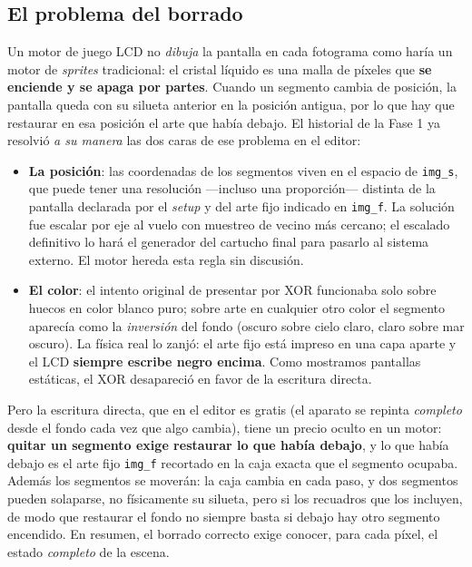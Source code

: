 \subsection{El problema del borrado}
\label{subsec:ProblemaBorrado}

Un motor de juego LCD no \emph{dibuja} la pantalla en cada fotograma como haría un motor de \textit{sprites} tradicional: el cristal líquido es una malla de píxeles que \textbf{se enciende y se apaga por partes}. Cuando un segmento cambia de posición, la pantalla queda con su silueta anterior en la posición antigua, por lo que hay que restaurar en esa posición el arte que había debajo. El historial de la Fase 1 ya resolvió \emph{a su manera} las dos caras de ese problema en el editor:

\begin{itemize}
	\item \textbf{La posición}: las coordenadas de los segmentos viven en el espacio de \texttt{img\_s}, que puede tener una resolución ---incluso una proporción--- distinta de la pantalla declarada por el \textit{setup} y del arte fijo indicado en \texttt{img\_f}. La solución fue escalar por eje al vuelo con muestreo de vecino más cercano; el escalado definitivo lo hará el generador del cartucho final para pasarlo al sistema externo. El motor hereda esta regla sin discusión.
	
	\item \textbf{El color}: el intento original de presentar por XOR funcionaba solo sobre huecos en color blanco puro; sobre arte en cualquier otro color el segmento aparecía como la \emph{inversión} del fondo (oscuro sobre cielo claro, claro sobre mar oscuro). La física real lo zanjó: el arte fijo está impreso en una capa aparte y el LCD \textbf{siempre escribe negro encima}. Como mostramos pantallas estáticas, el XOR desapareció en favor de la escritura directa.
\end{itemize}

Pero la escritura directa, que en el editor es gratis (el aparato se repinta \emph{completo} desde el fondo cada vez que algo cambia), tiene un precio oculto en un motor: \textbf{quitar un segmento exige restaurar lo que había debajo}, y lo que había debajo es el arte fijo \texttt{img\_f} recortado en la caja exacta que el segmento ocupaba. Además los segmentos se moverán: la caja cambia en cada paso, y dos segmentos pueden solaparse, no físicamente su silueta, pero si los recuadros que los incluyen, de modo que restaurar el fondo no siempre basta si debajo hay otro segmento encendido. En resumen, el borrado correcto exige conocer, para cada píxel, el estado \emph{completo} de la escena.

